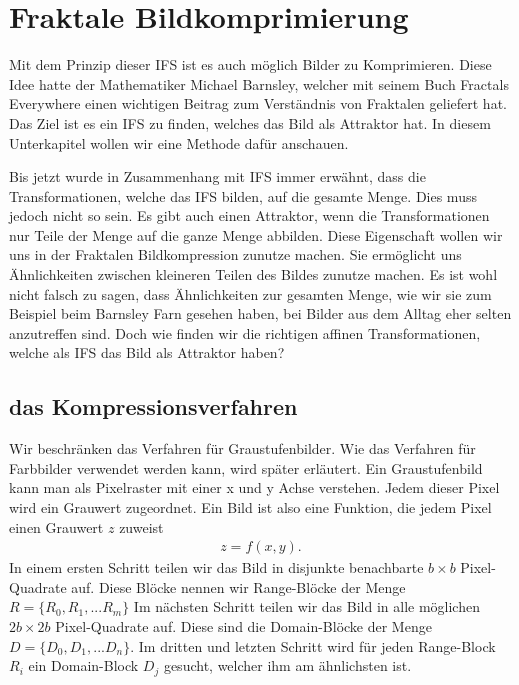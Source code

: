 %
%
%
\section{Fraktale Bildkomprimierung
\label{ifs:section:teil3}}
Mit dem Prinzip dieser IFS ist es auch möglich Bilder zu Komprimieren.
Diese Idee hatte der Mathematiker Michael Barnsley, welcher mit seinem Buch Fractals Everywhere einen wichtigen Beitrag zum Verständnis von Fraktalen geliefert hat.
Das Ziel ist es ein IFS zu finden, welches das Bild als Attraktor hat.
In diesem Unterkapitel wollen wir eine Methode dafür anschauen.\cite{ifs:Rousseau2012}


Bis jetzt wurde in Zusammenhang mit IFS immer erwähnt, dass die Transformationen, welche das IFS bilden, auf die gesamte Menge.
Dies muss jedoch nicht so sein. 
Es gibt auch einen Attraktor, wenn die Transformationen nur Teile der Menge auf die ganze Menge abbilden.
Diese Eigenschaft wollen wir uns in der Fraktalen Bildkompression zunutze machen.
Sie ermöglicht uns Ähnlichkeiten zwischen kleineren Teilen des Bildes zunutze machen.
Es ist wohl nicht falsch zu sagen, dass Ähnlichkeiten zur gesamten Menge, wie wir sie zum Beispiel beim Barnsley Farn gesehen haben, bei Bilder aus dem Alltag eher selten anzutreffen sind.
Doch wie finden wir die richtigen affinen Transformationen, welche als IFS das Bild als Attraktor haben?

\subsection{das Kompressionsverfahren
\label{ifs:subsection:malorum}}
Wir beschränken das Verfahren für Graustufenbilder. Wie das Verfahren für Farbbilder verwendet werden kann, wird später erläutert.
Ein Graustufenbild kann man als Pixelraster mit einer x und y Achse verstehen.
Jedem dieser Pixel wird ein Grauwert zugeordnet.
Ein Bild ist also eine Funktion, die jedem Pixel einen Grauwert $z$ zuweist
\begin{align*}
	z = f(x,y).
\end{align*} 
In einem ersten Schritt teilen wir das Bild in disjunkte benachbarte $b \times b$ Pixel-Quadrate auf. Diese Blöcke nennen wir Range-Blöcke der Menge $R=\{R_0,R_1,...R_m\}$
Im nächsten Schritt teilen wir das Bild in alle möglichen $2b \times 2b$ Pixel-Quadrate auf. Diese sind die Domain-Blöcke der Menge $D = \{D_0,D_1,...D_n\}$. 
Im dritten und letzten Schritt wird für jeden Range-Block $R_i$ ein Domain-Block $D_j$ gesucht, welcher ihm am ähnlichsten ist.

